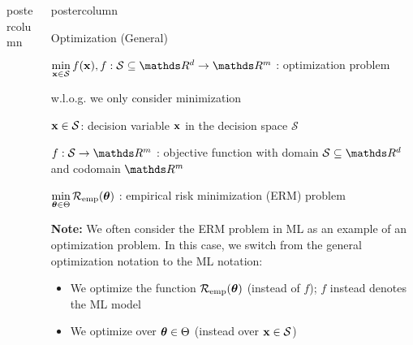 \documentclass{beamer}
\newlength{\columnheight} %
\begin{document}
\begin{frame}[fragile]{}
\begin{columns}
\begin{column}{.31\textwidth}
\begin{beamercolorbox}[center]{postercolumn}
\begin{minipage}{.98\textwidth}
{					%
					\vfill
				}
			\end{minipage}
		\end{beamercolorbox}
	\end{column}
	\begin{column}{.31\textwidth}
		\begin{beamercolorbox}[center]{postercolumn}
			\begin{minipage}{.98\textwidth}
				\parbox[t][\columnheight]{\textwidth}{
					\vspace*{0.75cm}
					\begin{myblock}{Optimization (General)}
						\begin{codebox}
							$\min\limits_{\xv \in \mathcal{S}} f(\xv), f: \mathcal{S}\subseteq \R^d \to \R^m$ :
							 optimization problem
						\end{codebox}
						\hspace*{1ex} w.l.o.g. we only consider minimization \\
						\begin{codebox}
							$\mathbf{x} \in \mathcal{S}$: decision variable $\mathbf{x}$ in the decision space $\mathcal{S}$
						\end{codebox}
						\hspace*{1ex}
						\begin{codebox}
							 $f: \mathcal{S} \to \R^m$ : objective function with domain $\mathcal{S} \subseteq \R^d$ and codomain $\R^m$
						\end{codebox}
						\hspace*{1ex} 
						\begin{codebox}
							$\min\limits_{\bm{\theta} \in \Theta} \mathcal{R}_{\text{emp}}(\bm{\theta})$ : empirical risk minimization (ERM) problem
						\end{codebox}
						\hspace*{1ex} \textbf{Note:} We often consider the ERM problem in ML as an example of an optimization problem. In this case, we switch from the general optimization notation to the ML notation: 
						\begin{itemize}
							\item We optimize the function $\mathcal{R}_{\text{emp}}(\bm{\theta})$ (instead of $f$); $f$ instead denotes the ML model
							\item We optimize over $\bm{\theta} \in \Theta$ (instead over $\mathbf{x} \in \mathcal{S}$) 
						\end{itemize}

\end{myblock}}
\end{minipage}
\end{beamercolorbox}
\end{column}
\end{columns}
\end{frame}
\end{document}
